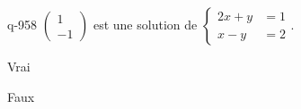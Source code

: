 \begin{truefalse}{q-958}
$\begin{pmatrix}1\\-1\end{pmatrix}$ est une solution de $\begin{cases}2x+y &= 1 \\ x-y &= 2\end{cases}$.
\item* Vrai
\item Faux
\end{truefalse}

